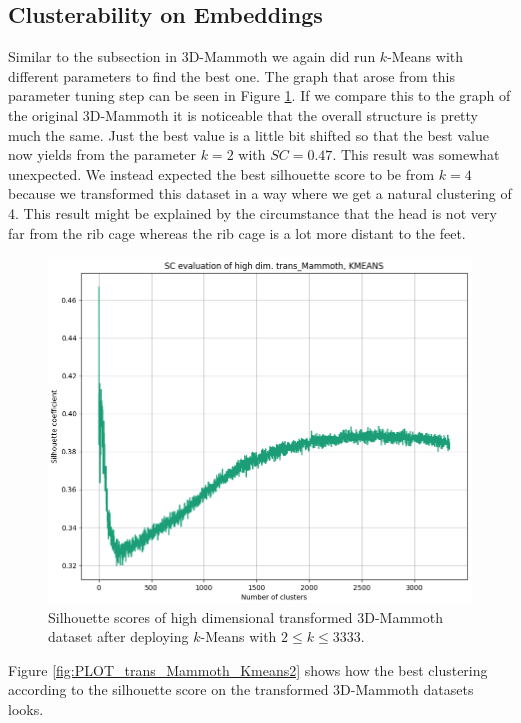 \subsection{Clusterability on Embeddings} \label{subsec:clu_transmamm}

Similar to the subsection in 3D-Mammoth we again did run $k$-Means with different parameters to find the best one. The graph that arose from this parameter tuning step can be seen in Figure \ref{fig:SC_KMEANS_trans_MammothHighh}. If we compare this to the graph of the original 3D-Mammoth it is noticeable that the overall structure is pretty much the same. Just the best value is a little bit shifted so that the best value now yields from the parameter $k=2$ with $SC=0.47$. This result was somewhat unexpected. We instead expected the best silhouette score to be from $k=4$ because we transformed this dataset in a way where we get a natural clustering of 4. This result might be explained by the circumstance that the head is not very far from the rib cage whereas the rib cage is a lot more distant to the feet. 

\begin{figure}[!]
	\centering
	\includegraphics[width=0.85\columnwidth]{images/SC_KMEANS_trans_MammothHighh.png}
	\caption[Silhouette Scores for Transformed 3D-Mammoth]{Silhouette scores of high dimensional transformed 3D-Mammoth dataset after deploying $k$-Means with $2\leq k \leq 3333$.}
    \label{fig:SC_KMEANS_trans_MammothHighh}
\end{figure}

Figure \ref{fig:PLOT_trans_Mammoth_Kmeans2} shows how the best clustering according to the silhouette score on the transformed 3D-Mammoth datasets looks.

